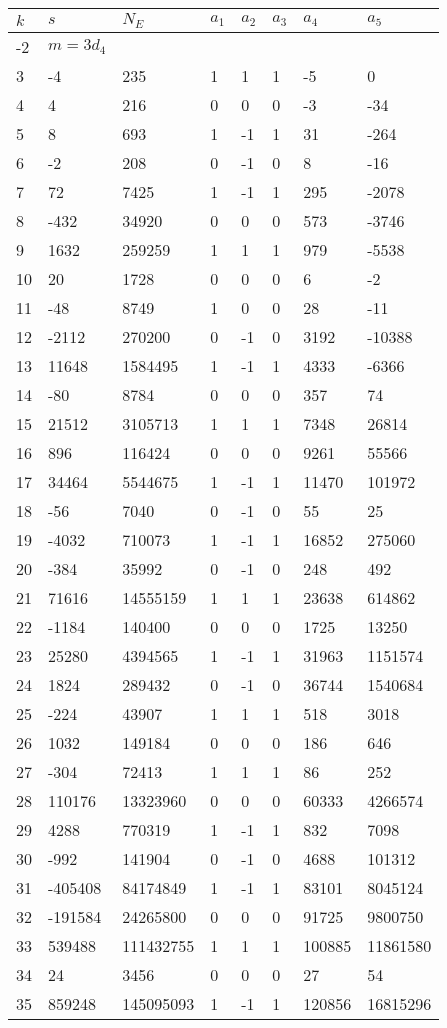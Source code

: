 \documentclass{amsart}
\begin{document}
\begin{longtable}{|l|l|l|lllll|}
\hline
$k$ & $s$ & $N_E$ & $a_1$ & $a_2$ & $a_3$ & $a_4$ & $a_5$\\
\hline
-2&$m=3d_{4}$&&\multicolumn{5}{c|}{}\\
3&-4&235&1&1&1&-5&0\\
4&4&216&0&0&0&-3&-34\\
5&8&693&1&-1&1&31&-264\\
6&-2&208&0&-1&0&8&-16\\
7&72&7425&1&-1&1&295&-2078\\
8&-432&34920&0&0&0&573&-3746\\
9&1632&259259&1&1&1&979&-5538\\
10&20&1728&0&0&0&6&-2\\
11&-48&8749&1&0&0&28&-11\\
12&-2112&270200&0&-1&0&3192&-10388\\
13&11648&1584495&1&-1&1&4333&-6366\\
14&-80&8784&0&0&0&357&74\\
15&21512&3105713&1&1&1&7348&26814\\
16&896&116424&0&0&0&9261&55566\\
17&34464&5544675&1&-1&1&11470&101972\\
18&-56&7040&0&-1&0&55&25\\
19&-4032&710073&1&-1&1&16852&275060\\
20&-384&35992&0&-1&0&248&492\\
21&71616&14555159&1&1&1&23638&614862\\
22&-1184&140400&0&0&0&1725&13250\\
23&25280&4394565&1&-1&1&31963&1151574\\
24&1824&289432&0&-1&0&36744&1540684\\
25&-224&43907&1&1&1&518&3018\\
26&1032&149184&0&0&0&186&646\\
27&-304&72413&1&1&1&86&252\\
28&110176&13323960&0&0&0&60333&4266574\\
29&4288&770319&1&-1&1&832&7098\\
30&-992&141904&0&-1&0&4688&101312\\
31&-405408&84174849&1&-1&1&83101&8045124\\
32&-191584&24265800&0&0&0&91725&9800750\\
33&539488&111432755&1&1&1&100885&11861580\\
34&24&3456&0&0&0&27&54\\
35&859248&145095093&1&-1&1&120856&16815296\\

\end{longtable}
\end{document}
